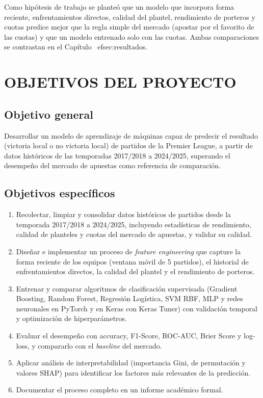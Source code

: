 \documentclass[12pt,letterpaper,oneside]{report}
\begin{document}
Como hipótesis de trabajo se planteó que un modelo que incorpora forma reciente, enfrentamientos directos, calidad del plantel, rendimiento de porteros y cuotas predice mejor que la regla simple del mercado (apostar por el favorito de las cuotas) y que un modelo entrenado solo con las cuotas. Ambas comparaciones se contrastan en el Capítulo~
ef{sec:resultados}.

\chapter{OBJETIVOS DEL PROYECTO}
\label{sec:objetivos}

\section{Objetivo general}
Desarrollar un modelo de aprendizaje de máquinas capaz de predecir el resultado (victoria local o no victoria local) de partidos de la Premier League, a partir de datos históricos de las temporadas 2017/2018 a 2024/2025, superando el desempeño del mercado de apuestas como referencia de comparación.

\section{Objetivos específicos}
\begin{enumerate}
\item Recolectar, limpiar y consolidar datos históricos de partidos desde la temporada 2017/2018 a 2024/2025, incluyendo estadísticas de rendimiento, calidad de planteles y cuotas del mercado de apuestas, y validar su calidad.
\item Diseñar e implementar un proceso de \textit{feature engineering} que capture la forma reciente de los equipos (ventana móvil de 5 partidos), el historial de enfrentamientos directos, la calidad del plantel y el rendimiento de porteros.
\item Entrenar y comparar algoritmos de clasificación supervisada (Gradient Boosting, Random Forest, Regresión Logística, SVM RBF, MLP y redes neuronales en PyTorch y en Keras con Keras Tuner) con validación temporal y optimización de hiperparámetros.
\item Evaluar el desempeño con accuracy, F1-Score, ROC-AUC, Brier Score y log-loss, y compararlo con el \textit{baseline} del mercado.
\item Aplicar análisis de interpretabilidad (importancia Gini, de permutación y valores SHAP) para identificar los factores más relevantes de la predicción.
\item Documentar el proceso completo en un informe académico formal.
\end{enumerate}
\end{document}
